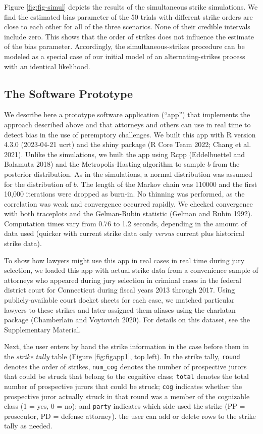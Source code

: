 \documentclass[12pt]{article}
\begin{document}
Figure \ref{fig:fig-simul} depicts the results of the simultaneous strike simulations. We find the estimated bias parameter of the 50 trials with different strike orders are close to each other for all of the three scenarios. None of their credible intervals include zero. This shows that the order of strikes does not influence the estimate of the bias parameter. Accordingly, the simultaneous-strikes procedure can be modeled as a special case of our initial model of an alternating-strikes process with an identical likelihood.

\hypertarget{prototype}{%
\subsection{The Software Prototype}\label{prototype}}

We describe here a prototype software application (``app'') that implements the approach described above and that attorneys and others can use in real time to detect bias in the use of peremptory challenges. We built this app with R version 4.3.0 (2023-04-21 ucrt) and the shiny package (R Core Team 2022; Chang et al. 2021). Unlike the simulations, we built the app using Rcpp (Eddelbuettel and Balamuta 2018) and the Metropolis-Hasting algorithm to sample \(b\) from the posterior distribution. As in the simulations, a normal distribution was assumed for the distribution of \(b\). The length of the Markov chain was 110000 and the first 10,000 iterations were dropped as burn-in. No thinning was performed, as the correlation was weak and convergence occurred rapidly. We checked convergence with both traceplots and the Gelman-Rubin statistic (Gelman and Rubin 1992). Computation times vary from 0.76 to 1.2 seconds, depending in the amount of data used (quicker with current strike data only \emph{versus} current plus historical strike data).

To show how lawyers might use this app in real cases in real time during jury selection, we loaded this app with actual strike data from a convenience sample of attorneys who appeared during jury selection in criminal cases in the federal district court for Connecticut during fiscal years 2013 through 2017. Using publicly-available court docket sheets for each case, we matched particular lawyers to these strikes and later assigned them aliases using the charlatan package (Chamberlain and Voytovich 2020). For details on this dataset, see the Supplementary Material.

Next, the user enters by hand the strike information in the case before them in the \emph{strike tally} table (Figure \ref{fig:figapp1}, top left). In the strike tally, \texttt{round} denotes the order of strikes, \texttt{num\_cog} denotes the number of prospective jurors that could be struck that belong to the cognitive class; \texttt{total} denotes the total number of prospective jurors that could be struck; \texttt{cog} indicates whether the prospective juror actually struck in that round was a member of the cognizable class (1 = yes, 0 = no); and \texttt{party} indicates which side used the strike (PP = prosecutor, PD = defense attorney). the user can add or delete rows to the strike tally as needed.
\end{document}
